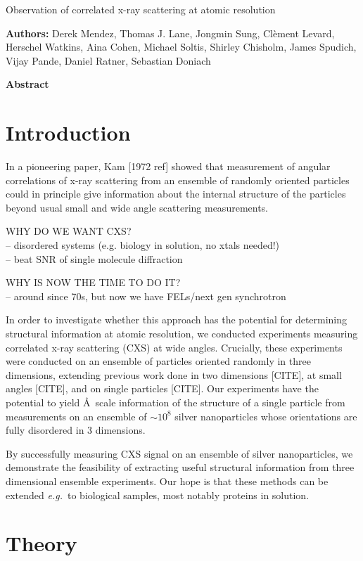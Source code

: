 \documentclass [11pt,fleqn]{article}
\def \hfb {\hfill\break}
\begin{document}
 
\hspace{1cm}{\bf New Title:} Observation of correlated x-ray scattering at atomic resolution \hfb
 
{\bf Authors:} Derek Mendez, Thomas J. Lane, Jongmin Sung,  Cl\`ement Levard, Herschel Watkins, Aina Cohen, Michael Soltis, Shirley Chisholm, James Spudich, Vijay Pande,  Daniel Ratner, Sebastian Doniach

{\bf Abstract}


\section{Introduction}

In a pioneering paper, Kam [1972 ref] showed that measurement of angular correlations of x-ray scattering from an ensemble of randomly oriented particles could in principle give information about the internal structure of the particles beyond usual small and wide angle scattering measurements. 

WHY DO WE WANT CXS? \\
-- disordered systems (e.g. biology in solution, no xtals needed!) \\
-- beat SNR of single molecule diffraction

WHY IS NOW THE TIME TO DO IT? \\
-- around since 70s, but now we have FELs/next gen synchrotron

In order to investigate whether this approach has the potential for determining structural information at atomic resolution, we conducted experiments measuring correlated x-ray scattering (CXS) at wide angles. Crucially, these experiments were conducted on an ensemble of particles oriented randomly in three dimensions, extending previous work done in two dimensions [CITE], at small angles [CITE], and on single particles [CITE]. Our experiments have the potential to yield \AA\ scale information of the structure of a single particle from measurements on an ensemble of $\sim 10^8$ silver nanoparticles whose orientations are fully disordered in 3 dimensions.

By successfully measuring CXS signal on an ensemble of silver nanoparticles, we demonstrate the feasibility of extracting useful structural information from three dimensional ensemble experiments. Our hope is that these methods can be extended \textit{e.g.}~to biological samples, most notably proteins in solution.

\section{Theory}
\end{document}
